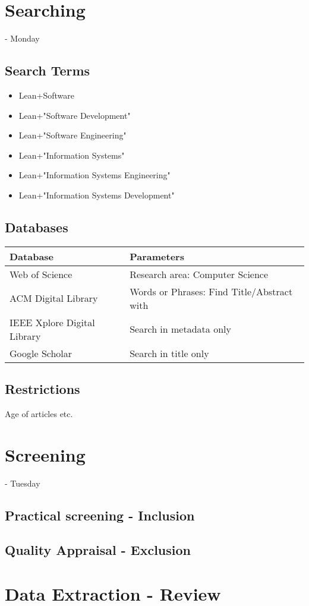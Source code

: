 

\section{Searching} - Monday
\subsection{Search Terms}

\begin{itemize}
	\item Lean+Software
	\item Lean+"Software Development"
	\item Lean+"Software Engineering"
	\item Lean+"Information Systems"
	\item Lean+"Information Systems Engineering"
	\item Lean+"Information Systems Development"
\end{itemize}

\subsection{Databases}
\begin{tabular}{|l|l|}
	\hline \textbf{Database} & \textbf{Parameters} \\ 
	\hline Web of Science & Research area: Computer Science \\ 
	\hline ACM Digital Library &  Words or Phrases: Find Title/Abstract with \\
	\hline IEEE Xplore Digital Library & Search in metadata only \\ 
	\hline Google Scholar & Search in title only \\ 
	\hline 
\end{tabular} 

\subsection{Restrictions}
Age of articles etc.



\section{Screening} - Tuesday
\subsection{Practical screening - Inclusion}

\subsection{Quality Appraisal - Exclusion}





\section{Data Extraction - Review}




